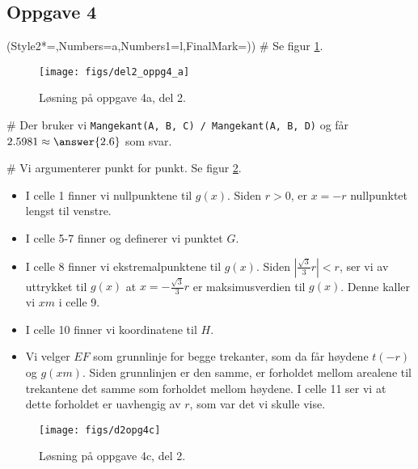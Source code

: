 \subsection*{Oppgave 4}
\begin{easylist}[enumerate]
	\ListProperties(Style2*=,Numbers=a,Numbers1=l,FinalMark={)})
	# Se figur \ref{fig:del2_oppg4_a}.
	\begin{figure}[ht!]
		\centering
		\texttt{[image: figs/del2\_oppg4\_a]}
		\caption{Løsning på oppgave 4a, del 2.}
		\label{fig:del2_oppg4_a}
	\end{figure}
	
	
	# Der bruker vi \verb|Mangekant(A, B, C) / Mangekant(A, B, D)| og får $2.5981 \approx \answer{2.6}$ som svar.
	
	
	# Vi argumenterer punkt for punkt. 
	Se figur \ref{fig:del2_oppg4_c}.
	\begin{itemize}
		\item I celle 1 finner vi nullpunktene til $ g(x) $. Siden $ r>0 $, er $ x=-r $ nullpunktet lengst til venstre.
		\item I celle 5-7 finner og definerer vi punktet $ G $.
		\item I celle 8 finner vi ekstremalpunktene til $ g(x) $. Siden $ \left|\frac{\sqrt{3}}{3}r\right|<r$, ser vi av uttrykket til $ g(x) $ at $ x=-\frac{\sqrt{3}}{3}r $ er maksimusverdien til $ g(x) $. Denne kaller vi $ xm $ i celle 9.
		\item I celle 10 finner vi koordinatene til $ H $.
		\item Vi velger $ EF $ som grunnlinje for begge trekanter, som da får høydene $ t(-r) $ og $ g(xm) $. Siden grunnlinjen er den samme, er forholdet mellom arealene til trekantene det samme som forholdet mellom høydene. I celle 11 ser vi at dette forholdet er uavhengig av $ r $, som var det vi skulle vise.
	\end{itemize}\begin{figure}
		\centering
		\texttt{[image: figs/d2opg4c]}
		\caption{Løsning på oppgave 4c, del 2.}
		\label{fig:del2_oppg4_c}
	\end{figure}
\end{easylist}





